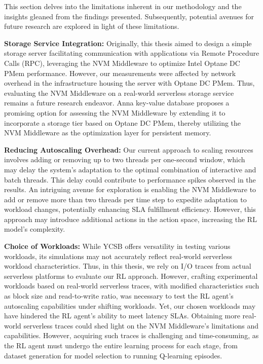 This section delves into the limitations inherent in our methodology and the insights gleaned from the findings presented. Subsequently, potential avenues for future research are explored in light of these limitations.

\textbf{Storage Service Integration:} Originally, this thesis aimed to design a simple storage server facilitating communication with applications via Remote Procedure Calls (RPC), leveraging the NVM Middleware to optimize Intel Optane DC PMem performance. However, our measurements were affected by network overhead in the infrastructure housing the server with Optane DC PMem. Thus, evaluating the NVM Middleware on a real-world serverless storage service remains a future research endeavor. Anna key-value database \cite{wu2019anna} proposes a promising option for assessing the NVM Middleware by extending it to incorporate a storage tier based on Optane DC PMem, thereby utilizing the NVM Middleware as the optimization layer for persistent memory.

\textbf{Reducing Autoscaling Overhead:} Our current approach to scaling resources involves adding or removing up to two threads per one-second window, which may delay the system's adaptation to the optimal combination of interactive and batch threads. This delay could contribute to performance spikes observed in the results. An intriguing avenue for exploration is enabling the NVM Middleware to add or remove more than two threads per time step to expedite adaptation to workload changes, potentially enhancing SLA fulfillment efficiency. However, this approach may introduce additional actions in the action space, increasing the RL model's complexity.

\textbf{Choice of Workloads:} While YCSB offers versatility in testing various workloads, its simulations may not accurately reflect real-world serverless workload characteristics. Thus, in this thesis, we rely on I/O traces from actual serverless platforms to evaluate our RL approach. However, crafting experimental workloads based on real-world serverless traces, with modified characteristics such as block size and read-to-write ratio, was necessary to test the RL agent's autoscaling capabilities under shifting workloads. Yet, our chosen workloads may have hindered the RL agent's ability to meet latency SLAs. Obtaining more real-world serverless traces could shed light on the NVM Middleware's limitations and capabilities. However, acquiring such traces is challenging and time-consuming, as the RL agent must undergo the entire learning process for each stage, from dataset generation for model selection to running Q-learning episodes.

